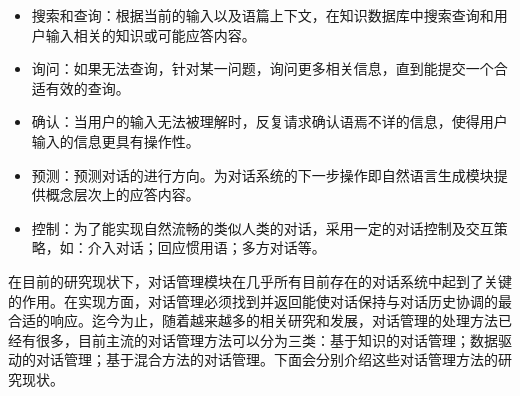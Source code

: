 \begin{itemize}

\item 搜索和查询：根据当前的输入以及语篇上下文，在知识数据库中搜索查询和用户输入相关的知识或可能应答内容。
\item 询问：如果无法查询，针对某一问题，询问更多相关信息，直到能提交一个合适有效的查询。
\item 确认：当用户的输入无法被理解时，反复请求确认语焉不详的信息，使得用户输入的信息更具有操作性。
\item 预测：预测对话的进行方向。为对话系统的下一步操作即自然语言生成模块提供概念层次上的应答内容。
\item 控制：为了能实现自然流畅的类似人类的对话，采用一定的对话控制及交互策略，如：介入对话；回应惯用语；多方对话等。
\end{itemize}

在目前的研究现状下，对话管理模块在几乎所有目前存在的对话系统中起到了关键的作用。在实现方面，对话管理必须找到并返回能使对话保持与对话历史协调的最合适的响应。迄今为止，随着越来越多的相关研究和发展，对话管理的处理方法已经有很多，目前主流的对话管理方法可以分为三类：基于知识的对话管理；数据驱动的对话管理；基于混合方法的对话管理。下面会分别介绍这些对话管理方法的研究现状。

